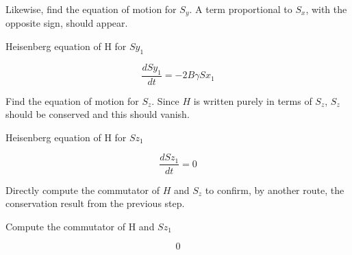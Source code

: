 \documentclass[dvipdfmx]{article}
\begin{document}
Likewise, find the equation of motion for $S_y$. A term proportional to $S_x$, with the opposite sign, should appear.

Heisenberg equation of H for $Sy_1$

\begin{equation}
  \frac{d Sy_1}{d t} = - 2 B \gamma Sx_1
  \label{eq:E5}
\end{equation}

Find the equation of motion for $S_z$. Since $H$ is written purely in terms of $S_z$, $S_z$ should be conserved and this should vanish.

Heisenberg equation of H for $Sz_1$

\begin{equation}
  \frac{d Sz_1}{d t} = 0
  \label{eq:E6}
\end{equation}

Directly compute the commutator of $H$ and $S_z$ to confirm, by another route, the conservation result from the previous step.

Compute the commutator of H and $Sz_1$

\begin{equation}
  0
  \label{eq:E7}
\end{equation}
\end{document}
